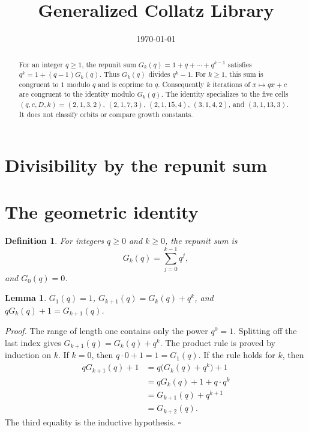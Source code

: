 \documentclass[11pt,letterpaper]{article}
\title{Generalized Collatz Library}
\author{}
\date{\today}
\newtheorem{lemma}[theorem]{Lemma}
\newtheorem{definition}[theorem]{Definition}
\newenvironment{proof}{\noindent\textit{Proof.}}{\hfill\(\square\)}
\begin{document}
\maketitle
\section*{Divisibility by the repunit sum}

\begin{abstract}
For an integer \(q\ge 1\), the repunit sum \(G_k(q)=1+q+\cdots+q^{k-1}\) satisfies \(q^k=1+(q-1)G_k(q)\). Thus \(G_k(q)\) divides \(q^k-1\). For \(k\ge 1\), this sum is congruent to \(1\) modulo \(q\) and is coprime to \(q\). Consequently \(k\) iterations of \(x\mapsto qx+c\) are congruent to the identity modulo \(G_k(q)\). The identity specializes to the five cells \((q,c,D,k)=(2,1,3,2)\), \((2,1,7,3)\), \((2,1,15,4)\), \((3,1,4,2)\), and \((3,1,13,3)\). It does not classify orbits or compare growth constants.
\end{abstract}

\section{The geometric identity}

\begin{definition}
For integers \(q\ge 0\) and \(k\ge 0\), the repunit sum is
\[
G_k(q)=\sum_{j=0}^{k-1}q^j,
\]
and \(G_0(q)=0\).
\end{definition}

\begin{lemma}
\label{lem:recurrence}
\(G_1(q)=1\), \(G_{k+1}(q)=G_k(q)+q^k\), and \(qG_k(q)+1=G_{k+1}(q)\).
\end{lemma}

\begin{proof}
The range of length one contains only the power \(q^0=1\). Splitting off the last index gives \(G_{k+1}(q)=G_k(q)+q^k\). The product rule is proved by induction on \(k\). If \(k=0\), then \(q\cdot 0+1=1=G_1(q)\). If the rule holds for \(k\), then
\begin{align*}
qG_{k+1}(q)+1
&=q\bigl(G_k(q)+q^k\bigr)+1 \\
&=qG_k(q)+1+q\cdot q^k \\
&=G_{k+1}(q)+q^{k+1} \\
&=G_{k+2}(q).
\end{align*}
The third equality is the inductive hypothesis.
\end{proof}
\end{document}
